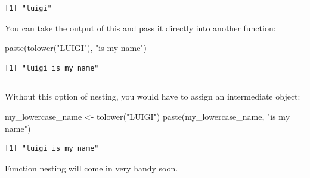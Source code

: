 \documentclass[
  letterpaper,
  DIV=11,
  numbers=noendperiod]{scrreprt}
\newenvironment{Shaded}{\begin{snugshade}}{\end{snugshade}}
\newcommand{\FunctionTok}[1]{\textcolor[rgb]{0.28,0.35,0.67}{#1}}
\newcommand{\NormalTok}[1]{\textcolor[rgb]{0.00,0.23,0.31}{#1}}
\newcommand{\OtherTok}[1]{\textcolor[rgb]{0.00,0.23,0.31}{#1}}
\newcommand{\StringTok}[1]{\textcolor[rgb]{0.13,0.47,0.30}{#1}}
\begin{document}
\begin{verbatim}
[1] "luigi"
\end{verbatim}

You can take the output of this and pass it directly into another
function:

\begin{Shaded}
\begin{Highlighting}[]
\FunctionTok{paste}\NormalTok{(}\FunctionTok{tolower}\NormalTok{(}\StringTok{"LUIGI"}\NormalTok{), }\StringTok{"is my name"}\NormalTok{)}
\end{Highlighting}
\end{Shaded}

\begin{verbatim}
[1] "luigi is my name"
\end{verbatim}

\begin{center}\rule{0.5\linewidth}{0.5pt}\end{center}

Without this option of nesting, you would have to assign an intermediate
object:

\begin{Shaded}
\begin{Highlighting}[]
\NormalTok{my\_lowercase\_name }\OtherTok{\textless{}{-}} \FunctionTok{tolower}\NormalTok{(}\StringTok{"LUIGI"}\NormalTok{)}
\FunctionTok{paste}\NormalTok{(my\_lowercase\_name, }\StringTok{"is my name"}\NormalTok{)}
\end{Highlighting}
\end{Shaded}

\begin{verbatim}
[1] "luigi is my name"
\end{verbatim}

Function nesting will come in very handy soon.
\end{document}
